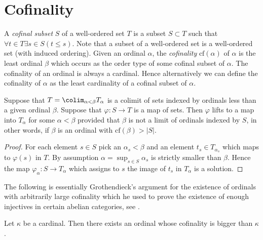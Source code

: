 \section{Cofinality}
\label{section-cofinality}

\noindent
A {\it cofinal subset} $S$ of a well-ordered set $T$ is a subset
$S \subset T$ such that $\forall t \in T \exists s\in S (t \leq s)$.
Note that a subset of a well-ordered set is a well-ordered set
(with induced ordering). Given an ordinal $\alpha$, the {\it cofinality}
$\text{cf}(\alpha)$ of $\alpha$ is the least ordinal $\beta$
which occurs as the order type of some cofinal subset of $\alpha$.
The cofinality of an ordinal is always a cardinal.
Hence alternatively we can define the cofinality of
$\alpha$ as the least cardinality of a cofinal subset of $\alpha$.

\begin{lemma}
\label{lemma-map-from-set-lifts}
Suppose that $T = \colim_{\alpha < \beta} T_\alpha$
is a colimit of sets indexed by ordinals less than a given ordinal $\beta$.
Suppose that $\varphi : S \to T$ is a map of sets.
Then $\varphi$ lifts to a map into $T_\alpha$ for some $\alpha < \beta$
provided that $\beta$ is not a limit of ordinals indexed by $S$,
in other words, if $\beta$ is an ordinal with $\text{cf}(\beta) > |S|$.
\end{lemma}

\begin{proof}
For each element $s \in S$ pick an $\alpha_s < \beta$ and an element
$t_s \in T_{\alpha_s}$ which maps to $\varphi(s)$ in $T$.
By assumption $\alpha = \sup_{s \in S} \alpha_s$ is strictly smaller
than $\beta$. Hence the map $\varphi_\alpha : S \to T_\alpha$
which assigns to $s$ the image of $t_s$ in $T_\alpha$ is a solution.
\end{proof}

\noindent
The following is essentially Grothendieck's argument for the existence
of ordinals with arbitrarily large cofinality which he used to prove
the existence of enough injectives in certain abelian categories, see
\cite{Tohoku}.

\begin{proposition}
\label{proposition-exist-ordinals-large-cofinality}
Let $\kappa$ be a cardinal. Then there exists an ordinal
whose cofinality is bigger than $\kappa$.
\end{proposition}

